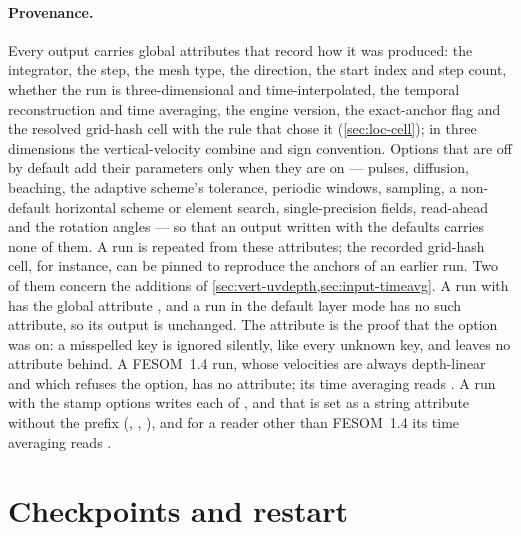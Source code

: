 \paragraph{Provenance.} Every output carries global attributes that record how it was produced: the
integrator, the step, the mesh type, the direction, the start index and step count, whether the run is
three-dimensional and time-interpolated, the temporal reconstruction and time averaging, the engine version,
the exact-anchor flag and the resolved grid-hash cell with the rule that chose it (\cref{sec:loc-cell}); in
three dimensions the vertical-velocity combine and sign convention. Options that are off by default add their
parameters only when they are on --- pulses, diffusion, beaching, the adaptive scheme's tolerance, periodic
windows, sampling, a non-default horizontal scheme or element search, single-precision fields, read-ahead and
the rotation angles --- so that an output written with the defaults carries none of them. A run is repeated
from these attributes; the recorded grid-hash cell, for instance, can be pinned to reproduce the anchors of
an earlier run. Two of them concern the additions of \cref{sec:vert-uvdepth,sec:input-timeavg}. A run with
 has the global attribute , and a run in
the default layer mode has no such attribute, so its output is unchanged. The attribute is the proof that
the option was on: a misspelled key is ignored silently, like every unknown key, and leaves no attribute
behind. A FESOM~1.4 run, whose velocities are always depth-linear and which refuses the option, has no
 attribute; its time averaging reads . A run with the
stamp options writes each of ,  and
 that is set as a string attribute without the  prefix
(, , ), and for a reader other than
FESOM~1.4 its time averaging reads .

\section{Checkpoints and restart}\label{sec:out-restart}

